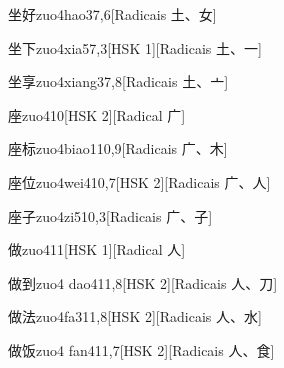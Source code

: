 \begin{entry}{坐好}{zuo4hao3}{7,6}[Radicais ⼟、⼥]
\end{entry}

\begin{entry}{坐下}{zuo4xia5}{7,3}[HSK 1][Radicais ⼟、⼀]
\end{entry}

\begin{entry}{坐享}{zuo4xiang3}{7,8}[Radicais ⼟、⼇]
\end{entry}

\begin{entry}{座}{zuo4}{10}[HSK 2][Radical ⼴]
\end{entry}

\begin{entry}{座标}{zuo4biao1}{10,9}[Radicais ⼴、⽊]
\end{entry}

\begin{entry}{座位}{zuo4wei4}{10,7}[HSK 2][Radicais ⼴、⼈]
\end{entry}

\begin{entry}{座子}{zuo4zi5}{10,3}[Radicais ⼴、⼦]
\end{entry}

\begin{entry}{做}{zuo4}{11}[HSK 1][Radical ⼈]
\end{entry}

\begin{entry}{做到}{zuo4 dao4}{11,8}[HSK 2][Radicais ⼈、⼑]
\end{entry}

\begin{entry}{做法}{zuo4fa3}{11,8}[HSK 2][Radicais ⼈、⽔]
\end{entry}

\begin{entry}{做饭}{zuo4 fan4}{11,7}[HSK 2][Radicais ⼈、⾷]
\end{entry}

